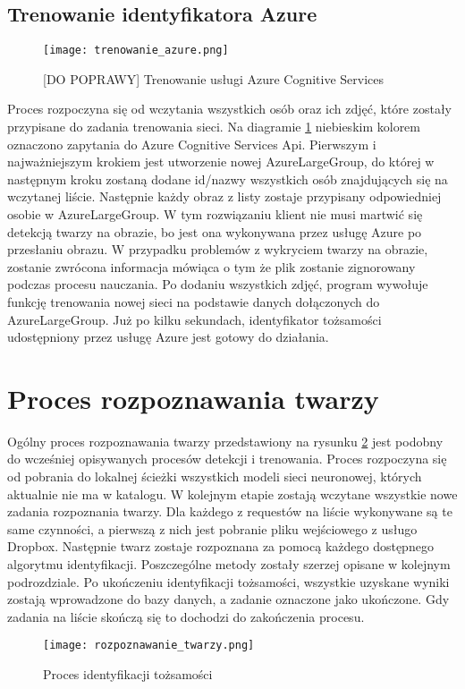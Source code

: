 \subsection{Trenowanie identyfikatora Azure} \label{trenowanie_azure}
\begin{figure}[H]
	\centering
	\texttt{[image: trenowanie\_azure.png]}
	\caption{[DO POPRAWY] Trenowanie usługi Azure Cognitive Services}
	\label{fig:trenowanie_azure}
\end{figure}
Proces rozpoczyna się od wczytania wszystkich osób oraz ich zdjęć, które zostały przypisane do zadania trenowania sieci. Na diagramie \ref{fig:trenowanie_azure} niebieskim kolorem oznaczono zapytania do Azure Cognitive Services Api. Pierwszym i najważniejszym krokiem jest utworzenie nowej AzureLargeGroup, do której w następnym kroku zostaną dodane id/nazwy wszystkich osób znajdujących się na wczytanej liście.  Następnie każdy obraz z listy zostaje przypisany odpowiedniej osobie w AzureLargeGroup. W tym rozwiązaniu klient nie musi martwić się detekcją twarzy na obrazie, bo jest ona wykonywana przez usługę Azure po przesłaniu obrazu. W przypadku problemów z wykryciem twarzy na obrazie, zostanie zwrócona informacja mówiąca o tym że plik zostanie zignorowany podczas procesu nauczania. Po dodaniu wszystkich zdjęć, program wywołuje funkcję trenowania nowej sieci na podstawie danych dołączonych do AzureLargeGroup. Już po kilku sekundach, identyfikator tożsamości udostępniony przez usługę Azure jest gotowy do działania.

\section{Proces rozpoznawania twarzy}
Ogólny proces rozpoznawania twarzy przedstawiony na rysunku \ref{fig:rozpoznawanie_proces} jest podobny do wcześniej opisywanych procesów detekcji i trenowania. Proces rozpoczyna się od pobrania do lokalnej ścieżki wszystkich modeli sieci neuronowej, których aktualnie nie ma w katalogu. W kolejnym etapie zostają wczytane wszystkie nowe zadania rozpoznania twarzy. Dla każdego z requestów na liście wykonywane są te same czynności, a pierwszą z nich jest pobranie pliku wejściowego z usługo Dropbox. Następnie twarz zostaje rozpoznana za pomocą każdego dostępnego algorytmu identyfikacji. Poszczególne metody zostały szerzej opisane w kolejnym podrozdziale. Po ukończeniu identyfikacji tożsamości, wszystkie uzyskane wyniki zostają wprowadzone do bazy danych, a zadanie oznaczone jako ukończone. Gdy zadania na liście skończą się to dochodzi do zakończenia procesu.
\begin{figure}[H]
	\centering
	\texttt{[image: rozpoznawanie\_twarzy.png]}
	\caption{Proces identyfikacji tożsamości}
	\label{fig:rozpoznawanie_proces}
\end{figure}

